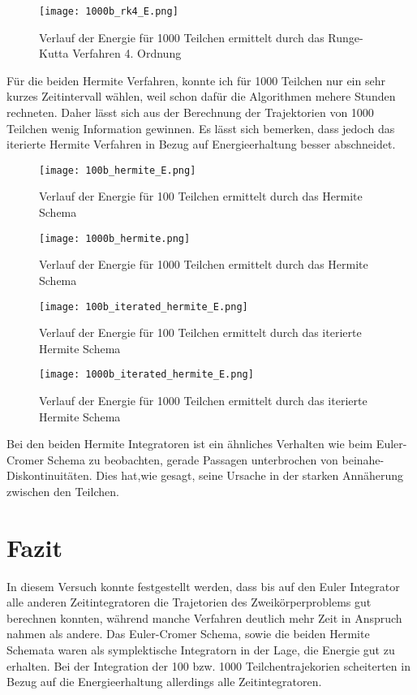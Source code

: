 \documentclass[12pt]{article}
\begin{document}
\begin{figure}[H]\centering\texttt{[image: 1000b\_rk4\_E.png]}\caption{Verlauf der Energie für 1000 Teilchen ermittelt durch das Runge-Kutta Verfahren 4. Ordnung}\end{figure}
Für die beiden Hermite Verfahren, konnte ich für 1000 Teilchen nur ein sehr kurzes Zeitintervall wählen, weil schon dafür die Algorithmen mehere Stunden rechneten. Daher lässt sich aus der Berechnung der Trajektorien von 1000 Teilchen wenig Information gewinnen. Es lässt sich bemerken, dass jedoch das iterierte Hermite Verfahren in Bezug auf Energieerhaltung besser abschneidet.
\begin{figure}[H]\centering\texttt{[image: 100b\_hermite\_E.png]}\caption{Verlauf der Energie für 100 Teilchen ermittelt durch das Hermite Schema}\end{figure}

\begin{figure}[H]\centering\texttt{[image: 1000b\_hermite.png]}\caption{Verlauf der Energie für 1000 Teilchen ermittelt durch das Hermite Schema}\end{figure}

\begin{figure}[H]\centering\texttt{[image: 100b\_iterated\_hermite\_E.png]}\caption{Verlauf der Energie für 100 Teilchen ermittelt durch das iterierte Hermite Schema}\end{figure}

\begin{figure}[H]\centering\texttt{[image: 1000b\_iterated\_hermite\_E.png]}\caption{Verlauf der Energie für 1000 Teilchen ermittelt durch das iterierte Hermite Schema}\end{figure}
Bei den beiden Hermite Integratoren ist ein ähnliches Verhalten wie beim Euler-Cromer Schema zu beobachten, gerade Passagen unterbrochen von beinahe-Diskontinuitäten. Dies hat,wie gesagt, seine Ursache in der starken Annäherung zwischen den Teilchen.
\section*{Fazit}

In diesem Versuch konnte festgestellt werden, dass bis auf den Euler Integrator alle anderen Zeitintegratoren die Trajetorien des Zweikörperproblems gut berechnen konnten, während manche Verfahren deutlich mehr Zeit in Anspruch nahmen als andere. Das Euler-Cromer Schema, sowie die beiden Hermite Schemata waren als symplektische Integratorn in der Lage, die Energie gut zu erhalten. Bei der Integration der 100 bzw. 1000 Teilchentrajekorien scheiterten in Bezug auf die Energieerhaltung allerdings alle Zeitintegratoren.
\end{document}
